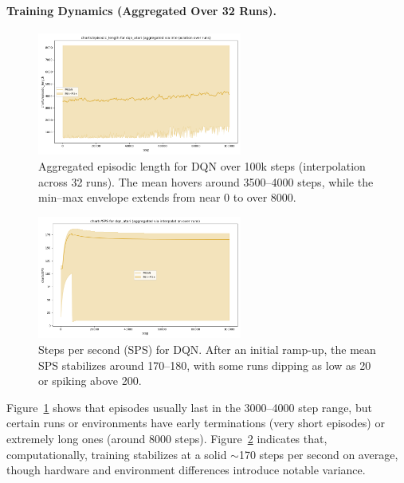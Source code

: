 \paragraph{Training Dynamics (Aggregated Over 32 Runs).}

\begin{figure}[htbp]
	\centering
	\includegraphics[width=0.6\textwidth]{figures/dqn/charts_episodic_length_dqn_atari.png}
	\caption{Aggregated episodic length for DQN over 100k steps 
		(interpolation across 32 runs). 
		The mean hovers around 3500--4000 steps, 
		while the min--max envelope extends from near 0 to over 8000.}
	\label{fig:dqn_episodic_length}
\end{figure}

\begin{figure}[htbp]
	\centering
	\includegraphics[width=0.6\textwidth]{figures/dqn/charts_SPS_dqn_atari.png}
	\caption{Steps per second (SPS) for DQN. After an initial ramp-up, 
		the mean SPS stabilizes around 170--180, 
		with some runs dipping as low as 20 or spiking above 200.}
	\label{fig:dqn_sps}
\end{figure}

Figure~\ref{fig:dqn_episodic_length} shows that episodes usually last in the 3000--4000 step range, 
but certain runs or environments have early terminations (very short episodes) or extremely long ones (around 8000 steps).  
Figure~\ref{fig:dqn_sps} indicates that, computationally, training stabilizes at a solid 
\(\sim\)170 steps per second on average, though hardware and environment differences 
introduce notable variance.

